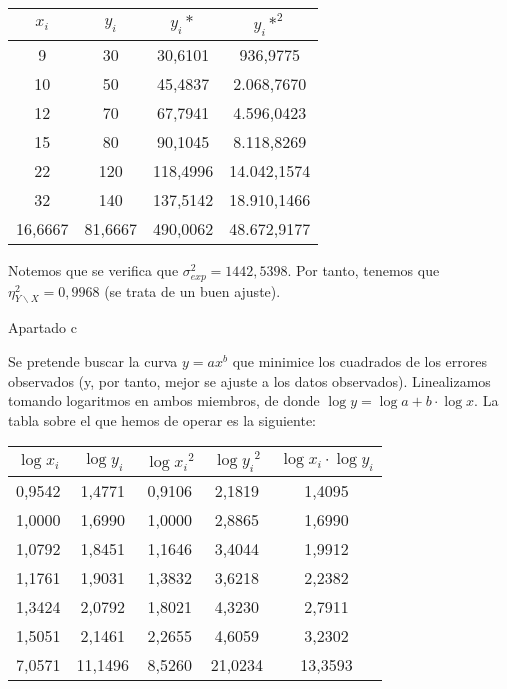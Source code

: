 \documentclass{article}
\begin{document}
\begin{center}
	\begin{tabular}{ c c|c c }
	
	$x_i$ & $y_i$ & $y_i*$ & $y_i*^2$ \\ \hline
	9 & 30 & 30,6101 & 936,9775 \\ 
	10 & 50 & 45,4837 & 2.068,7670 \\ 
	12 & 70 & 67,7941 & 4.596,0423 \\ 
	15 & 80 & 90,1045 & 8.118,8269 \\ 
	22 & 120 & 118,4996 & 14.042,1574 \\ 
	32 & 140 & 137,5142 & 18.910,1466 \\ \hline
	16,6667 & 81,6667 & 490,0062 & 48.672,9177 \\ 
\end{tabular}
\end{center}

Notemos que se verifica que $\sigma_{exp}^2 = 1442,5398$. Por tanto, tenemos que $\eta_{Y\backslash X}^2 = 0,9968$ (se trata de un buen ajuste).

Apartado c

Se pretende buscar la curva $y =  ax^b$ que minimice los cuadrados de los errores observados (y, por tanto, mejor se ajuste a los datos observados). Linealizamos tomando logaritmos en ambos miembros, de donde $\log{y} = \log{a} + b·\log{x}$. La tabla sobre el que hemos de operar es la siguiente:

\begin{center}
	\begin{tabular}{ c|c|c c c }
	
	$\log{x_i}$ & $\log{y_i}$ & $\log{x_i}^2$ & $\log{y_i}^2$ & $\log{x_i}·\log{y_i}$ \\ \hline
	0,9542 & 1,4771 & 0,9106 & 2,1819 & 1,4095 \\ 
	1,0000 & 1,6990 & 1,0000 & 2,8865 & 1,6990 \\ 
	1,0792 & 1,8451 & 1,1646 & 3,4044 & 1,9912 \\ 
	1,1761 & 1,9031 & 1,3832 & 3,6218 & 2,2382 \\ 
	1,3424 & 2,0792 & 1,8021 & 4,3230 & 2,7911 \\ 
	1,5051 & 2,1461 & 2,2655 & 4,6059 & 3,2302 \\ \hline
	7,0571 & 11,1496 & 8,5260 & 21,0234 & 13,3593 \\ 
\end{tabular}
\end{center}
\end{document}
